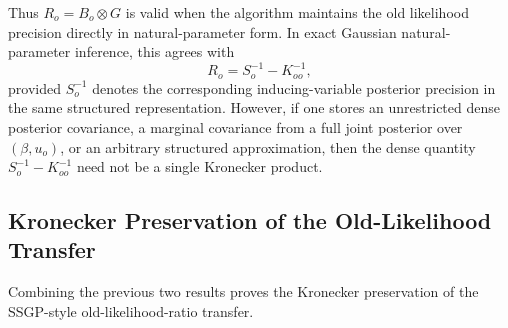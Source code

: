 \documentclass[12pt]{article}
\begin{document}
Thus \(R_o=B_o\otimes G\) is valid when the algorithm maintains the old
likelihood precision directly in natural-parameter form. In exact
Gaussian natural-parameter inference, this agrees with
\begin{equation}
    R_o=S_o^{-1}-K_{oo}^{-1},
\end{equation}
provided \(S_o^{-1}\) denotes the corresponding inducing-variable
posterior precision in the same structured representation. However, if
one stores an unrestricted dense posterior covariance, a marginal
covariance from a full joint posterior over \((\beta,u_o)\), or an
arbitrary structured approximation, then the dense quantity
\(S_o^{-1}-K_{oo}^{-1}\) need not be a single Kronecker product.

\subsection{Kronecker Preservation of the Old-Likelihood Transfer}
\label{app:proof_Lambda_transfer_kron}

Combining the previous two results proves the Kronecker preservation of
the SSGP-style old-likelihood-ratio transfer.
\end{document}
